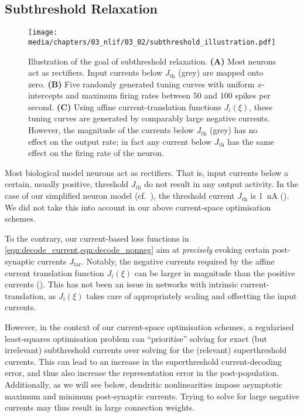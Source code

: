 \subsection{Subthreshold Relaxation}
\label{sec:nef_subthreshold}

\begin{figure}
	\texttt{[image: media/chapters/03\_nlif/03\_02/subthreshold\_illustration.pdf]}%
	{\label{fig:subthreshold_illustration_a}}%
	{\label{fig:subthreshold_illustration_b}}%
	{\label{fig:subthreshold_illustration_c}}%
	\caption[Illustration of the goal of subthreshold relaxation]{Illustration of the goal of subthreshold relaxation.
	\textbf{(A)} Most neurons act as rectifiers. Input currents below $J_\mathrm{th}$ (grey) are mapped onto zero.
	\textbf{(B)} Five randomly generated tuning curves with uniform $x$-intercepts and maximum firing rates between $50$ and $100$ spikes per second.
	\textbf{(C)} Using affine current-translation functions $J_i(\xi)$, these tuning curves are generated by comparably large negative currents. However, the magnitude of the currents below $J_\mathrm{th}$ (grey) has no effect on the output rate; in fact any current below $J_\mathrm{th}$ has the same effect on the firing rate of the neuron.
	}
\end{figure}

Most biological model neurons act as rectifiers.
That is, input currents below a certain, usually positive, threshold $J_\mathrm{th}$ do not result in any output activity.
In the case of our simplified \LIF neuron model (cf.~), the threshold current $J_\mathrm{th}$ is \SI{1}{\nano\ampere} ().
We did not take this into account in our above current-space optimisation schemes.

To the contrary, our current-based loss functions in \cref{eqn:decode_current,eqn:decode_nonneg} aim at \emph{precisely} evoking certain post-synaptic currents $J_\mathrm{tar}$.
Notably, the negative currents required by the affine current translation function $J_i(\xi)$ can be larger in magnitude than the positive currents ().
This has not been an issue in \NEF networks with intrinsic current-translation, as $J_i(\xi)$ takes care of appropriately scaling and offsetting the input currents.

However, in the context of our current-space optimisation schemes, a regularised least-squares optimisation problem can \enquote{prioritise} solving for exact (but irrelevant) subthreshold currents over solving for the (relevant) superthreshold currents.
This can lead to an increase in the superthreshold current-decoding error, and thus also increase the representation error in the post-population.
Additionally, as we will see below, dendritic nonlinearities impose asymptotic maximum and minimum post-synaptic currents.
Trying to solve for large negative currents may thus result in large connection weights.

